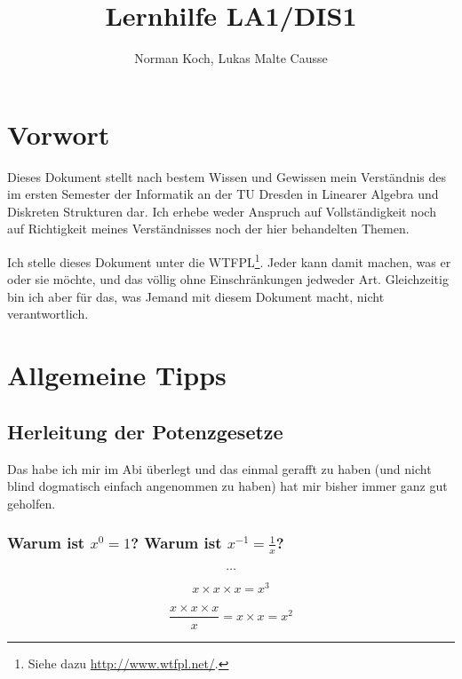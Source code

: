 \documentclass{scrartcl}
\author{Norman Koch, Lukas Malte Causse}
\title{Lernhilfe LA1/DIS1}
\begin{document}
\maketitle

\newpage

\tableofcontents

\newpage

\section{Vorwort}

Dieses Dokument stellt nach bestem Wissen und Gewissen mein Verständnis des im ersten Semester der Informatik an der TU Dresden
in Linearer Algebra und Diskreten Strukturen dar. Ich erhebe weder Anspruch auf Vollständigkeit noch auf Richtigkeit meines
Verständnisses noch der hier behandelten Themen.

Ich stelle dieses Dokument unter die WTFPL\footnote{Siehe dazu \url{http://www.wtfpl.net/}.}. Jeder kann damit machen, was er oder sie möchte, und das völlig ohne Einschränkungen
jedweder Art. Gleichzeitig bin ich aber für das, was Jemand mit diesem Dokument macht, nicht verantwortlich.

\newpage

\section{Allgemeine Tipps}

\subsection{Herleitung der Potenzgesetze}

Das habe ich mir im Abi überlegt und das einmal gerafft zu haben (und nicht blind dogmatisch einfach angenommen zu haben)
hat mir bisher immer ganz gut geholfen.

\subsubsection{Warum ist $x^0 = 1$? Warum ist $x^{-1} = \frac{1}{x}$?}

$$
\dots
$$

\begin{equation}
x \times x \times x = x^3 \tag*{: x}
\end{equation}

\begin{equation}
\frac{x \times x \times x}{x} = x \times x = x^2 \tag*{: x}
\end{equation}
\end{document}
